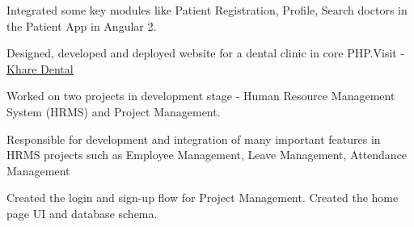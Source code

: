 \documentclass[]{deedy-resume-openfont}
\begin{document}
\begin{minipage}[t]{0.66\textwidth}
\sectionsep


\begin{tightemize}
 \item Integrated some key modules like Patient Registration, Profile, Search doctors in the Patient App in Angular 2. \item Designed, developed and deployed website for a dental clinic in core PHP.\newline Visit - \href{http://www.kharedentalclinic.com}{Khare Dental}  \end{tightemize}
 
\sectionsep


\begin{tightemize}
 \item Worked on two projects in development stage - Human Resource Management System (HRMS) and Project Management. \item Responsible for development and integration of many important features in HRMS projects such as
Employee Management, Leave Management, Attendance Management
\item Created the login and sign-up flow for Project Management. Created the home page UI and database
schema.
\end{tightemize}

\sectionsep



\end{minipage}
\end{document}
